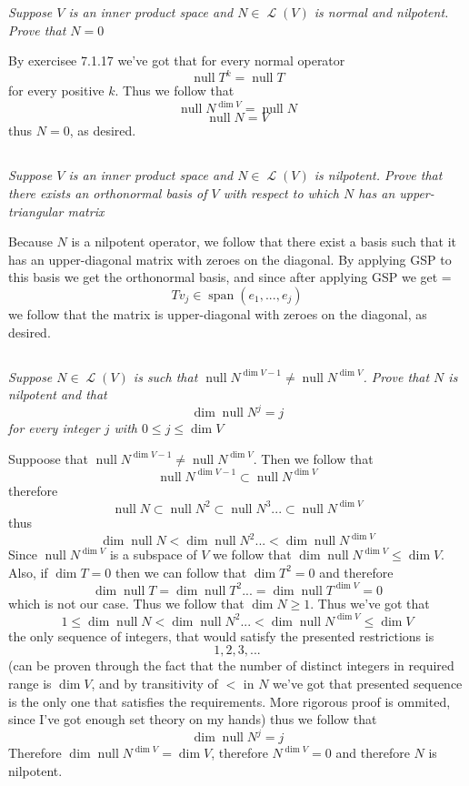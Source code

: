 \documentclass[11pt,oneside,titlepage]{book}
\DeclareMathOperator \map {\mathcal {L}}
\DeclareMathOperator \ns {null}
\DeclareMathOperator \Span {span}
\begin{document}
\textit{Suppose $V$ is an inner product space and $N \in \map(V)$ is normal and
  nilpotent. Prove that $N = 0$}

By exercisee 7.1.17 we've got that for every normal operator
$$\ns T^k = \ns T$$
for every positive $k$. Thus we follow that
$$\ns N^{\dim V} = \ns N $$
$$\ns  N = V$$
thus $N = 0$, as desired.

\subsection{}

\textit{Suppose $V$ is an inner product space and $N \in \map(V)$ is nilpotent.
  Prove that there exists an orthonormal basis of $V$ with respect to which $N$
  has an upper-triangular matrix}

Because $N$ is a nilpotent operator, we follow that there exist a basis such that
it has an upper-diagonal matrix with zeroes on the diagonal. By applying GSP
to this basis we get the orthonormal basis, and since after applying GSP we get =
$$Tv_j \in \Span(e_1, ..., e_j)$$
we follow that the matrix is upper-diagonal with zeroes on the diagonal, as desired.

\subsection{}

\textit{Suppose $N \in \map(V)$ is such that $\ns N^{\dim V - 1} \neq \ns N^{\dim V}$. Prove that
  $N$ is nilpotent and that
  $$\dim \ns N^j = j$$
  for every integer $j$ with $0 \leq j \leq \dim V$}

Suppoose that $\ns N^{\dim V - 1} \neq \ns N^{\dim V}$. Then we follow that
$$\ns N^{\dim V - 1} \subset \ns N^{\dim V}$$
therefore
$$\ns N \subset \ns N^2 \subset \ns N^3 ... \subset \ns N^{\dim V}$$
thus
$$\dim \ns N < \dim \ns N^2 ... < \dim \ns N^{\dim V}$$
Since $\ns N^{\dim V}$ is a subspace of $V$ we follow that $\dim \ns N^{\dim V} \leq \dim V$.
Also, if $\dim T = 0$ then we can follow that $\dim T^2 = 0$ and therefore
$$\dim \ns T = \dim \ns T^2 ...  = \dim \ns T^{\dim V} = 0$$
which is not our case. Thus we follow that $\dim N \geq 1$. Thus we've got that
$$1 \leq \dim \ns N < \dim \ns N^2 ... < \dim \ns N^{\dim V} \leq \dim V$$
the only sequence of integers, that would satisfy the presented restrictions is
$$1, 2, 3, ...$$
(can be proven through the fact that the number of distinct integers in required range is $\dim V$,
and by transitivity of $<$ in $N$ we've got that presented sequence is the only one
that satisfies the requirements. More rigorous proof is ommited, since I've got enough set
theory on my hands)
thus we follow that
$$\dim \ns N^j = j$$
Therefore $\dim \ns N^{\dim V} = \dim V$, therefore $N^{\dim V} = 0$ and therefore $N$
is nilpotent.
\end{document}
